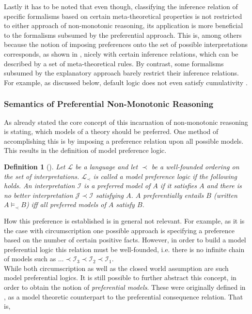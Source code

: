 \documentclass{article}
\newtheorem{mydef}[thm]{Definition}
\begin{document}
Lastly it has to be noted that even though, classifying the inference relation of specific formalisms based on certain meta-theoretical properties is not restricted to either approach of non-monotonic reasoning, its application is more beneficial to the formalisms subsumed by the preferential approach. This is, among others because the notion of imposing preferences onto the set of possible interpretations corresponds, as shown in \cite{kraus1990nonmonotonic},
nicely with certain inference relations, which can be described by a set of meta-theoretical rules. By contrast, some formalisms subsumed by the explanatory approach barely restrict their inference relations. For example, as discussed below, default logic does not even satisfy cumulativity \cite{brewka1997nonmonotonic,ANTONIOU2007517, kraus1990nonmonotonic}. 
\subsubsection{Semantics of Preferential Non-Monotonic Reasoning}
As already stated the core concept of this incarnation of non-monotonic reasoning is stating, which models of a theory should be preferred. One method of accomplishing this is by imposing a preference relation upon all possible models. This results in the definition of model preference logic.  

\begin{mydef}[\cite{BOCHMAN2007557, brewka1997nonmonotonic}]
Let $\mathcal{L}$ be a language and let $\prec$ be a well-founded ordering on the set of interpretations. $\mathcal{L}_{\prec}$ is called a model preference logic if the following holds. An interpretation $\mathcal{I}$ is a preferred model of $A$ if it satisfies $A$ and there is no better interpretation $\mathcal{J} \prec \mathcal{I}$ satisfying $A$. $A$ preferentially entails $B$ (written $A   \models_{\prec} B$) iff all preferred models of $A$ satisfy $B$.
\end{mydef} 


How this preference is established is in general not relevant. For example, as it is the case with circumscription one possible approach is specifying a preference based on the number of certain positive facts. However, in order to build a model preferential logic this relation must be well-founded, i.e. there is no infinite chain of models such as $\ldots \prec \mathcal{I}_3 \prec \mathcal{I}_2 \prec \mathcal{I}_1$.\cite{BOCHMAN2007557, brewka1997nonmonotonic}\\

While both circumscription as well as the closed world assumption are such model preferential logics. It is still possible to further abstract this concept, in order to obtain the notion of \emph{preferential models}. These were originally defined in \cite{kraus1990nonmonotonic}, as a model theoretic counterpart to the preferential consequence relation. That is,
\end{document}
